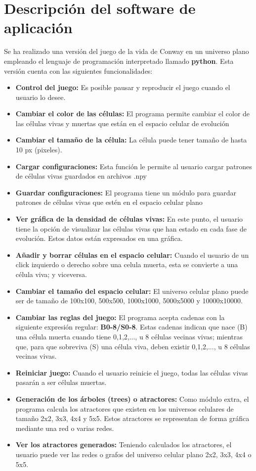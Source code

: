 \documentclass[12pt,a4paper]{book}
\begin{document}
	\section{Descripción del software de aplicación}
	Se ha realizado una versión del juego de la vida de Conway en un universo plano empleando el lenguaje de programación interpretado llamado \textbf{python}. Esta versión cuenta con las siguientes funcionalidades:
	\begin{itemize}
		\item \textbf{Control del juego:} Es posible pausar y reproducir el juego cuando el usuario lo desee.
		\item \textbf{Cambiar el color de las células:} El programa permite cambiar el color de las células vivas y muertas que están en el espacio celular de evolución
		\item \textbf{Cambiar el tamaño de la célula:} La célula puede tener tamaño de hasta 10 px (pixeles).
		\item \textbf{Cargar configuraciones: } Esta función le permite al usuario cargar patrones de células vivas guardados en archivos .npy
		\item \textbf{Guardar configuraciones:}  El programa tiene un módulo para guardar patrones de células vivas que estén en el espacio celular plano
		\item \textbf{Ver gráfica de la densidad de células vivas: }En este punto, el usuario tiene la opción de visualizar las células vivas que han estado en cada fase de evolución. Estos datos están expresados en una gráfica.
		\item \textbf{Añadir y borrar células en el espacio celular:} Cuando el usuario de un click izquierdo o derecho sobre una celula muerta, esta se convierte a una célula viva; y viceversa.
		\item \textbf{Cambiar el tamaño del espacio celular:} El universo celular plano puede ser de tamaño de 100x100, 500x500, 1000x1000, 5000x5000 y 10000x10000.
		\item \textbf{Cambiar las reglas del juego:} El programa acepta cadenas con la siguiente expresión regular: \textbf{B0-8/S0-8}. Estas cadenas indican que nace (B) una célula muerta cuando tiene  0,1,2,..., u 8 células vecinas vivas; mientras que, para que sobreviva (S) una célula viva, deben existir  0,1,2,..., u 8 células vecinas vivas.
		\item \textbf{Reiniciar juego:} Cuando el usuario reinicie el juego, todas las células vivas pasarán a ser células muertas.
		\item \textbf{Generación de los árboles (trees) o atractores:} Como módulo extra, el programa calcula los atractores que existen en los universos celulares de tamaño 2x2, 3x3, 4x4 y 5x5. Estos atractores se representan de forma gráfica mediante una red o varias redes.
		\item \textbf{Ver los atractores generados: }Teniendo calculados los atractores, el usuario puede ver las redes o grafos del universo celular plano 2x2, 3x3, 4x4 o  5x5.
	\end{itemize}
	
\end{document}

